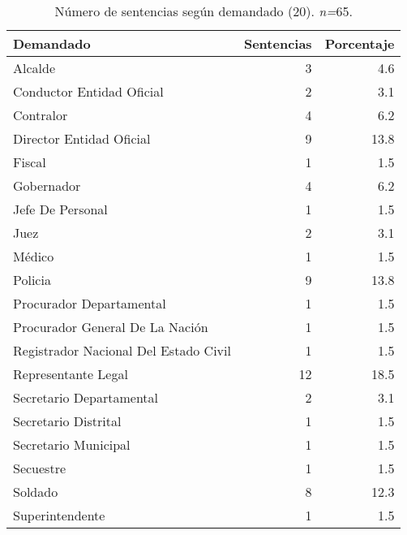 \begin{table}[!htbp]
\centering
\caption{Número de sentencias según demandado (20). \textit{n=}65.} 
\label{tab:demandado}
\begin{tabular}{lrr}
  \hline
Demandado & Sentencias & Porcentaje \\ 
  \hline
Alcalde &  3 & 4.6 \\ 
  Conductor Entidad Oficial &  2 & 3.1 \\ 
  Contralor &  4 & 6.2 \\ 
  Director Entidad Oficial &  9 & 13.8 \\ 
  Fiscal &  1 & 1.5 \\ 
  Gobernador &  4 & 6.2 \\ 
  Jefe De Personal &  1 & 1.5 \\ 
  Juez &  2 & 3.1 \\ 
  Médico &  1 & 1.5 \\ 
  Policia &  9 & 13.8 \\ 
  Procurador Departamental &  1 & 1.5 \\ 
  Procurador General De La Nación &  1 & 1.5 \\ 
  Registrador Nacional Del Estado Civil &  1 & 1.5 \\ 
  Representante Legal & 12 & 18.5 \\ 
  Secretario Departamental &  2 & 3.1 \\ 
  Secretario Distrital &  1 & 1.5 \\ 
  Secretario Municipal &  1 & 1.5 \\ 
  Secuestre &  1 & 1.5 \\ 
  Soldado &  8 & 12.3 \\ 
  Superintendente &  1 & 1.5 \\ 
   \hline
\end{tabular}
\end{table}
